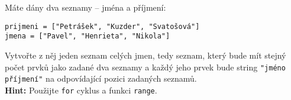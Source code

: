 \question[70]
Máte dány dva seznamy -- jména a příjmení:
\begin{center}
	\texttt{prijmeni = ["Petrášek", "Kuzder", "Svatošová"]}\\
	\texttt{jmena = ["Pavel", "Henrieta", "Nikola"]}
\end{center}
Vytvořte z něj jeden seznam celých jmen, tedy seznam, který bude mít stejný
počet prvků jako zadané dva seznamy a každý jeho prvek bude string
\texttt{"jméno příjmení"} na odpovídající pozici zadaných seznamů.\\
\textbf{Hint:} Použijte \texttt{for} cyklus a funkci \texttt{range}.